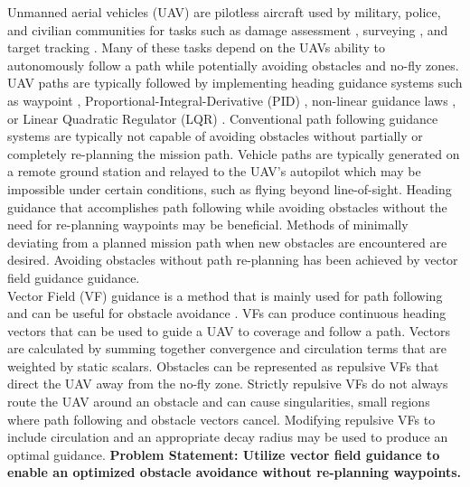 \documentclass[numbered,pdftex]{ohio-etd}
\begin{document}
Unmanned aerial vehicles (UAV) are pilotless aircraft used by military, police, and civilian communities for tasks such as damage assessment \cite{fernandez_galarreta_uav-based_2015}, surveying \cite{remondino_uav_2012}, and target tracking \cite{ariyur_autonomous_2008,teuliere_chasing_2011,frew_cooperative_2007,oh_coordinated_2013,hyondong_oh_coordinated_2015,oliveira_moving_2016}. Many of these tasks depend on the UAVs ability to autonomously follow a path while potentially avoiding obstacles and no-fly zones. UAV paths are typically followed by implementing heading guidance systems such as waypoint \cite{osborne_waypoint_2005}, Proportional-Integral-Derivative (PID) \cite{rhee2010tight}, non-linear guidance laws \cite{park2007performance}, or Linear Quadratic Regulator (LQR) \cite{ratnoo_adaptive_2011}. Conventional path following guidance systems are typically not capable of avoiding obstacles without partially or completely re-planning the mission path. Vehicle paths are typically generated on a remote ground station and relayed to the UAV’s autopilot which may be impossible under certain conditions, such as flying beyond line-of-sight. Heading guidance that accomplishes path following while avoiding obstacles without the need for re-planning waypoints may be beneficial. Methods of minimally deviating from a planned mission path when new obstacles are encountered are desired. Avoiding obstacles without path re-planning has been achieved by vector field guidance \cite{frew_cooperative_2007,griffiths_vector_2006,goncalves_artificial_2009,goncalves_circulation_2010,goncalves_vector_2010} guidance.\\

 

Vector Field (VF) guidance is a method that is mainly used for path following \cite{nelson_cooperative_2005,nelson_vector_2006,nelson_vector_2007,griffiths_vector_2006,goncalves_artificial_2009,goncalves_circulation_2010,goncalves_vector_2010} and can be useful for obstacle avoidance \cite{panagou_motion_2014,wilhelm_2019}. VFs can produce continuous heading vectors that can be used to guide a UAV to coverage and follow a path. Vectors are calculated by summing together convergence and circulation terms that are weighted by static scalars. Obstacles can be represented as repulsive VFs that direct the UAV away from the no-fly zone. Strictly repulsive VFs do not always route the UAV around an obstacle and can cause singularities, small regions where path following and obstacle vectors cancel. Modifying repulsive VFs to include circulation and an appropriate decay radius may be used to produce an optimal guidance. \textbf{Problem Statement: Utilize vector field guidance to enable an optimized obstacle avoidance without re-planning waypoints.}
 \pagebreak
 
\end{document}
